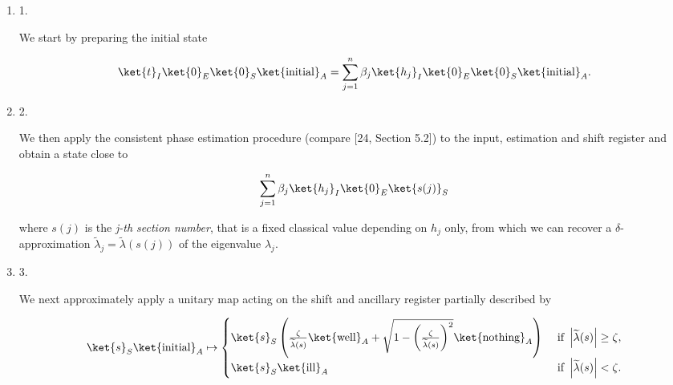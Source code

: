 \begin{enumerate}


\item[] 
1. 


We start by preparing the initial state\par


\[\begin{gathered}
\ket{t}_{I}\ket{0}_{E}\ket{0}_{S}\ket{\text{initial}}_{A}=\sum_{j=1}^{n}\beta_{j}\ket{h_{j}}_{I}\ket{0}_{E}\ket{0}_{S}\ket{\text{initial}}_{A}.
\end{gathered}\]





\item[] 
2. 


We then apply the consistent phase estimation procedure (compare [24, Section 5.2]) to the input, estimation and shift register and obtain a state close to\par


\[\begin{gathered}
\displaystyle\sum_{j=1}^{n}\beta_{j}\ket{h_{j}}_{I}\ket{0}_{E}\ket{s(j)}_{S}
\end{gathered}\]


where $s(j)$ is the \emph{j-th section number}, that is a fixed classical value depending on $h_{j}$ only, from which we can recover a $\delta$-approximation $\widetilde{\lambda}_{j}=\widetilde{\lambda}(s(j))$ of the eigenvalue $\lambda_{j}$.\par





\item[] 
3. 


We next approximately apply a unitary map acting on the shift and ancillary register partially described by\par


\[\begin{gathered}
\displaystyle\ket{s}_{S}\ket{\text{initial}}_{A}\mapsto\begin{cases}\ket{s}_{S}\left(\frac{\zeta}{\widetilde{\lambda}(s)}\ket{\text{well}}_{A}+\sqrt{1-\left(\frac{\zeta}{\widetilde{\lambda}(s)}\right)^{2}}\ket{\text{nothing}}_{A}\right)&\text{ if }\left|\widetilde{\lambda}(s)\right|\geq\zeta,\\
\ket{s}_{S}\ket{\text{ill}}_{A}&\text{ if }\left|\widetilde{\lambda}(s)\right|<\zeta.\end{cases}
\end{gathered}\]






\end{enumerate}
